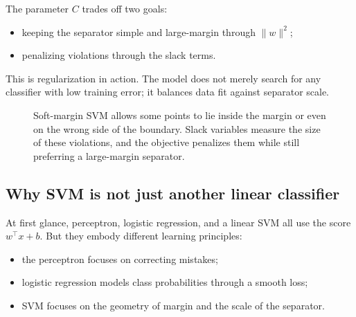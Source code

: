 The parameter $C$ trades off two goals:
\begin{itemize}
    \item keeping the separator simple and large-margin through $\|w\|^2$;
    \item penalizing violations through the slack terms.
\end{itemize}
This is regularization in action. The model does not merely search for any classifier with low training error; it balances data fit against separator scale.

\begin{figure}[tbp]
\centering
{}
\caption{Soft-margin SVM allows some points to lie inside the margin or even on the wrong side of the boundary. Slack variables measure the size of these violations, and the objective penalizes them while still preferring a large-margin separator.}
\end{figure}

\subsection*{Why SVM is not just another linear classifier}

At first glance, perceptron, logistic regression, and a linear SVM all use the score $w^\top x+b$. But they embody different learning principles:
\begin{itemize}
    \item the perceptron focuses on correcting mistakes;
    \item logistic regression models class probabilities through a smooth loss;
    \item SVM focuses on the geometry of margin and the scale of the separator.
\end{itemize}

